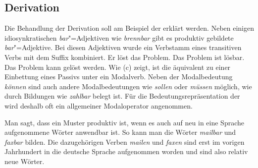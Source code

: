 



\subsection{Derivation}
\label{sec-bard}

Die Behandlung der Derivation soll am Beispiel der \bard erklärt werden. Neben einigen idiosynkratischen
\emph{bar}"=Adjektiven wie \zb \emph{brennbar} gibt es produktiv gebildete \emph{bar}"=Adjektive.
Bei diesen Adjektiven wurde ein Verbstamm eines transitiven Verbs mit dem Suffix  kombiniert.
\eal
\ex Er löst das Problem.
\ex Das Problem ist lösbar.
\ex Das Problem kann gelöst werden.
\zl
Wie (c) zeigt, ist die \bard äquivalent zu einer Einbettung eines Passivs unter ein Modalverb. Neben
der Modalbedeutung \emph{können} sind auch andere Modalbedeutungen wie \zb \emph{sollen} oder \emph{müssen}
möglich, wie durch Bildungen wie \emph{zahlbar} belegt ist. Für die Bedeutungsrepräsentation der \bard wird
deshalb oft ein allgemeiner Modaloperator angenommen.

Man sagt, dass ein Muster produktiv ist, wenn es auch auf neu in eine Sprache
aufgenommene Wörter anwendbar ist. So kann man \zb die Wörter \emph{mailbar} und \emph{faxbar}
bilden. Die dazugehörigen Verben \emph{mailen} und \emph{faxen} sind erst im vorigen Jahrhundert in
die deutsche Sprache aufgenommen worden und sind also relativ neue Wörter.

